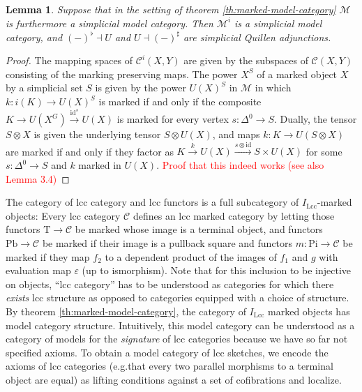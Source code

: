 \documentclass{article}
\newcommand{\todo}[1]{\textcolor{red}{#1}}
\newtheorem{lemma}{Lemma}
\begin{document}
\begin{lemma}
  Suppose that in the setting of theorem \ref{th:marked-model-category} $\mathcal{M}$ is furthermore a simplicial model category.
  Then $\mathcal{M}^i$ is a simplicial model category, and $(-)^\flat \dashv U$ and $U \dashv (-)^\sharp$ are simplicial Quillen adjunctions.
\end{lemma}
\begin{proof}
  The mapping spaces of $\mathcal{C}^i(X, Y)$ are given by the subspaces of $\mathcal{C}(X, Y)$ consisting of the marking preserving maps.
  The power $X^S$ of a marked object $X$ by a simplicial set $S$ is given by the power $U(X)^S$ in $\mathcal{M}$ in which $k : i(K) \rightarrow U(X)^S$ is marked if and only if the composite $K \rightarrow U(X^G) \xrightarrow{\mathrm{id}^s} U(X)$ is marked for every vertex $s : \Delta^0 \rightarrow S$.
  Dually, the tensor $S \otimes X$ is given the underlying tensor $S \otimes U(X)$, and maps $k : K \rightarrow U(S \otimes X)$ are marked if and only if they factor as $K \xrightarrow{k} U(X) \xrightarrow{s \otimes \mathrm{id}} S \times U(X)$ for some $s : \Delta^0 \rightarrow S$ and $k$ marked in $U(X)$.
  \todo{Proof that this indeed works (see also \cite{marked-objects} Lemma 3.4)}
\end{proof}

The category of lcc category and lcc functors is a full subcategory of $I_\mathrm{Lcc}$-marked objects:
Every lcc category $\mathcal{C}$ defines an lcc marked category by letting those functors $\mathrm{T} \rightarrow \mathcal{C}$ be marked whose image is a terminal object, and functors $\mathrm{Pb} \rightarrow \mathcal{C}$ be marked if their image is a pullback square and functors $m : \mathrm{Pi} \rightarrow \mathcal{C}$ be marked if they map $f_2$ to a dependent product of the images of $f_1$ and $g$ with evaluation map $\varepsilon$ (up to ismorphism).
Note that for this inclusion to be injective on objects, ``lcc category'' has to be understood as categories for which there \emph{exists} lcc structure as opposed to categories equipped with a choice of structure.
By theorem \ref{th:marked-model-category}, the category of $I_\mathrm{Lcc}$ marked objects has model category structure.
Intuitively, this model category can be understood as a category of models for the \emph{signature} of lcc categories because we have so far not specified axioms.
To obtain a model category of lcc sketches, we encode the axioms of lcc categories (e.g.\@ that every two parallel morphisms to a terminal object are equal) as lifting conditions against a set of cofibrations and localize.
\end{document}
